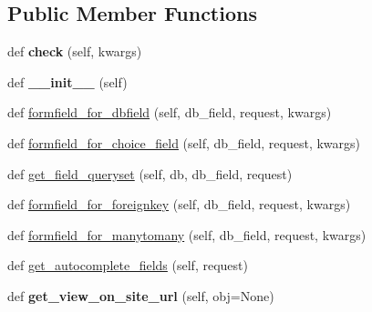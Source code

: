 \subsection*{Public Member Functions}
\begin{DoxyCompactItemize}
\item 
\mbox{\label{classdjango_1_1contrib_1_1admin_1_1options_1_1_base_model_admin_a39ba7e19e67ef91c9db7f4f4a5ed8907}} 
def {\bfseries check} (self, kwargs)
\item 
\mbox{\label{classdjango_1_1contrib_1_1admin_1_1options_1_1_base_model_admin_a6bd842db5b2dc4ec5c3308e0399e548d}} 
def {\bfseries \+\_\+\+\_\+init\+\_\+\+\_\+} (self)
\item 
def \mbox{\hyperlink{classdjango_1_1contrib_1_1admin_1_1options_1_1_base_model_admin_a5e395cafec399b722cbe3d65eb15d67a}{formfield\+\_\+for\+\_\+dbfield}} (self, db\+\_\+field, request, kwargs)
\item 
def \mbox{\hyperlink{classdjango_1_1contrib_1_1admin_1_1options_1_1_base_model_admin_aab9474dcabc7a04b772f10acf49f8447}{formfield\+\_\+for\+\_\+choice\+\_\+field}} (self, db\+\_\+field, request, kwargs)
\item 
def \mbox{\hyperlink{classdjango_1_1contrib_1_1admin_1_1options_1_1_base_model_admin_a022685398b82b425b5eba4d3d115ce05}{get\+\_\+field\+\_\+queryset}} (self, db, db\+\_\+field, request)
\item 
def \mbox{\hyperlink{classdjango_1_1contrib_1_1admin_1_1options_1_1_base_model_admin_ac1859630108e79185c9366f549a5fec5}{formfield\+\_\+for\+\_\+foreignkey}} (self, db\+\_\+field, request, kwargs)
\item 
def \mbox{\hyperlink{classdjango_1_1contrib_1_1admin_1_1options_1_1_base_model_admin_a0215ae72c612eb9db807b0d123647d63}{formfield\+\_\+for\+\_\+manytomany}} (self, db\+\_\+field, request, kwargs)
\item 
def \mbox{\hyperlink{classdjango_1_1contrib_1_1admin_1_1options_1_1_base_model_admin_a8bbcb80faedb624354454ada3e516897}{get\+\_\+autocomplete\+\_\+fields}} (self, request)
\item 
\mbox{\label{classdjango_1_1contrib_1_1admin_1_1options_1_1_base_model_admin_aa0b87fad896088c95151919b51c5db41}} 
def {\bfseries get\+\_\+view\+\_\+on\+\_\+site\+\_\+url} (self, obj=None)

\end{DoxyCompactItemize}
